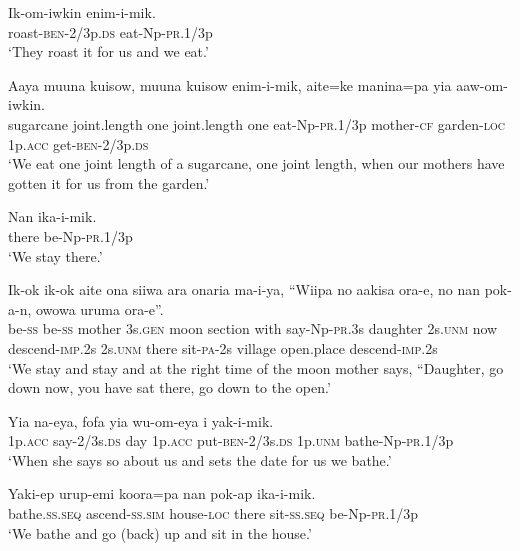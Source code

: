 \ea\label{ex:a:x9}
\gll  Ik-om-iwkin  enim-i-mik. \\
roast-\textsc{ben}-2/3p.\textsc{ds}  eat-Np-\textsc{pr}.1/3p \\
\glt ‘They roast it for us and we eat.’ \\
\z


\ea\label{ex:a:x10}
\gll  Aaya  muuna  kuisow,  muuna  kuisow  enim-i-mik,  aite=ke             manina=pa  yia  aaw-om-iwkin. \\
sugarcane  joint.length  one  joint.length  one  eat-Np-\textsc{pr}.1/3p  mother-\textsc{cf}  garden-\textsc{loc}  1p.\textsc{acc}  get-\textsc{ben}-2/3p.\textsc{ds} \\


\glt ‘We eat one joint length of a sugarcane, one joint length, when our mothers have gotten it for us from the garden.’ \\
\z


\ea\label{ex:a:x11}
\gll  Nan  ika-i-mik. \\
there  be-Np-\textsc{pr}.1/3p \\
\glt ‘We stay there.’ \\
\z


\ea\label{ex:a:x12}
\gll  Ik-ok  ik-ok  aite  ona  siiwa  ara  onaria  ma-i-ya,  “Wiipa       no  aakisa  ora-e,  no  nan  pok-a-n,  owowa  uruma                         ora-e”. \\
be-\textsc{ss}  be-\textsc{ss}  mother  3s.\textsc{gen}  moon  section  with  say-Np-\textsc{pr}.3s  daughter 2s.\textsc{unm}  now  descend-\textsc{imp}.2s  2s.\textsc{unm}  there  sit-\textsc{pa}-2s  village  open.place  descend-\textsc{imp}.2s \\




\glt ‘We stay and stay and at the right time of the moon mother says, “Daughter, go down now, you have sat there, go down to the open.’ \\
\z


\ea\label{ex:a:x13}
\gll  Yia  na-eya,  fofa  yia  wu-om-eya          i  yak-i-mik. \\
1p.\textsc{acc}  say-2/3s.\textsc{ds}  day  1p.\textsc{acc}  put-\textsc{ben}-2/3s.\textsc{ds} 1p.\textsc{unm}  bathe-Np-\textsc{pr}.1/3p \\


\glt ‘When she says so about us and sets the date for us we bathe.’ \\
\z


\ea\label{ex:a:x14}
\gll  Yaki-ep  urup-emi  koora=pa  nan  pok-ap  ika-i-mik. \\
bathe.\textsc{ss.seq}  ascend-\textsc{ss}.\textsc{sim}  house-\textsc{loc}  there  sit-\textsc{ss.seq}  be-Np-\textsc{pr}.1/3p \\
\glt ‘We bathe and go (back) up and sit in the house.’ \\
\z


